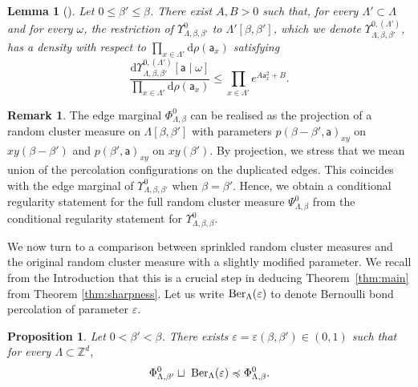 \documentclass[11pt,a4paper]{article}
\numberwithin{equation}{section}
\theoremstyle{plain}
\newtheorem{Lem}[Thm]{Lemma}
\newtheorem{Prop}[Thm]{Proposition}
\theoremstyle{definition}
\newtheorem{Rem}[Thm]{Remark}
\begin{document}
\begin{Lem}[{\hspace{1pt}\cite[Theorem~4.3, Remark 4.4]{PV26}}]\label{lem:conditional regularity}
Let $0\leq\beta'\leq\beta$. There exist $A,B>0$ such that, for every $\Lambda' \subset \Lambda$ and for every $\omega$, the restriction of $\Upsilon^0_{\Lambda,\beta,\beta'}$ to $\Lambda'[\beta,\beta']$, which we denote $\Upsilon_{\Lambda,\beta,\beta'}^{0, (\Lambda')}$, has a density with respect to $\prod_{x \in \Lambda'} \mathrm{d}\rho(\mathsf a_x)$ satisfying
 \begin{equation}
\frac{\mathrm{d}\Upsilon_{\Lambda,\beta,\beta'}^{0, (\Lambda')}[ \mathsf a \mid \omega]}{\prod_{x\in \Lambda'}\mathrm{d}\rho(\mathsf a_x)} \leq \prod_{x \in \Lambda'}e^{A \mathsf a_x^2 + B} .
\end{equation}
\end{Lem}

\begin{Rem} \label{remark: conditional reg phi}
The edge marginal  $\Phi^0_{\Lambda,\beta}$ can be realised as the projection of a random cluster measure on $\Lambda[\beta,\beta']$ with parameters $p(\beta-\beta',\mathsf a)_{xy}$ on $xy(\beta-\beta')$ and $p(\beta', \mathsf a)_{xy}$ on $xy(\beta')$. By projection, we stress that we mean union of the percolation configurations on the duplicated edges. This coincides with the edge marginal of $\Upsilon^0_{\Lambda,\beta,\beta'}$ when $\beta=\beta'$. Hence, we obtain a conditional regularity statement for the full random cluster measure $\Psi^0_{\Lambda,\beta}$ from the conditional regularity statement for $\Upsilon^0_{\Lambda,\beta,\beta}$. 
\end{Rem}

We now turn to a comparison between sprinkled random cluster measures and the original random cluster measure with a slightly modified parameter. We recall from the Introduction that this is a crucial step in deducing Theorem~\ref{thm:main} from Theorem \ref{thm:sharpness}. Let us write ${\rm Ber_\Lambda}(\varepsilon)$ to denote Bernoulli bond percolation of parameter $\varepsilon$.  
\begin{Prop}\label{prop:sprinkling}
Let $0<\beta'<\beta$. There exists $\varepsilon=\varepsilon(\beta,\beta')\in (0,1)$ such that for every $\Lambda\subset \mathbb{Z}^d$, 
\begin{equation}\label{eq:sprinkling}
\Phi_{\Lambda,\beta'}^0 \sqcup \textup{ Ber}_{\Lambda}(\varepsilon) \preccurlyeq \Phi_{\Lambda,\beta}^0.
\end{equation}
\end{Prop}
\end{document}
